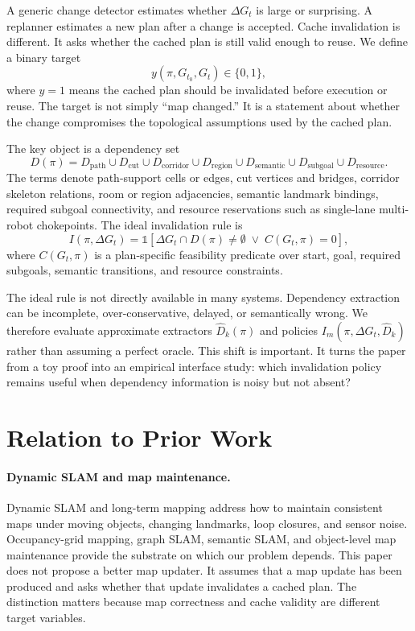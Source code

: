 \documentclass{article}
\begin{document}
A generic change detector estimates whether $\Delta G_t$ is large or surprising. A replanner estimates a new plan after a change is accepted. Cache invalidation is different. It asks whether the cached plan is still valid enough to reuse. We define a binary target
\begin{equation}
    y(\pi, G_{t_0}, G_t) \in \{0,1\},
\end{equation}
where $y=1$ means the cached plan should be invalidated before execution or reuse. The target is not simply ``map changed.'' It is a statement about whether the change compromises the topological assumptions used by the cached plan.

The key object is a dependency set
\begin{equation}
    D(\pi) = D_{\mathrm{path}} \cup D_{\mathrm{cut}} \cup D_{\mathrm{corridor}} \cup D_{\mathrm{region}} \cup D_{\mathrm{semantic}} \cup D_{\mathrm{subgoal}} \cup D_{\mathrm{resource}}.
\end{equation}
The terms denote path-support cells or edges, cut vertices and bridges, corridor skeleton relations, room or region adjacencies, semantic landmark bindings, required subgoal connectivity, and resource reservations such as single-lane multi-robot chokepoints. The ideal invalidation rule is
\begin{equation}
    I(\pi,\Delta G_t) = \mathbb{1}\left[\Delta G_t \cap D(\pi) \neq \emptyset \;\vee\; C(G_t,\pi) = 0 \right],
\end{equation}
where $C(G_t,\pi)$ is a plan-specific feasibility predicate over start, goal, required subgoals, semantic transitions, and resource constraints.

The ideal rule is not directly available in many systems. Dependency extraction can be incomplete, over-conservative, delayed, or semantically wrong. We therefore evaluate approximate extractors $\widehat{D}_k(\pi)$ and policies $I_m(\pi,\Delta G_t,\widehat{D}_k)$ rather than assuming a perfect oracle. This shift is important. It turns the paper from a toy proof into an empirical interface study: which invalidation policy remains useful when dependency information is noisy but not absent?

\section{Relation to Prior Work}

\paragraph{Dynamic SLAM and map maintenance.}
Dynamic SLAM and long-term mapping address how to maintain consistent maps under moving objects, changing landmarks, loop closures, and sensor noise. Occupancy-grid mapping, graph SLAM, semantic SLAM, and object-level map maintenance provide the substrate on which our problem depends. This paper does not propose a better map updater. It assumes that a map update has been produced and asks whether that update invalidates a cached plan. The distinction matters because map correctness and cache validity are different target variables.
\end{document}
